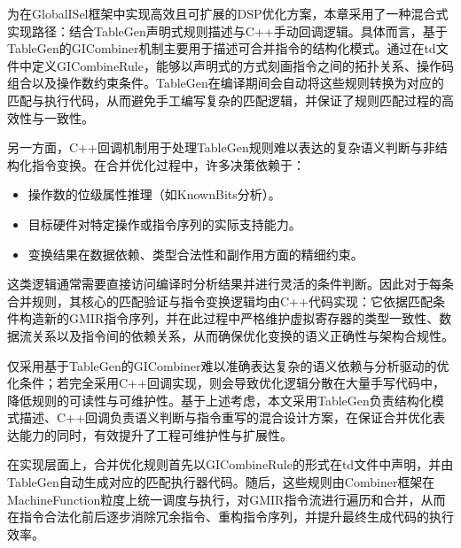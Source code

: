 \par

为在GlobalISel框架中实现高效且可扩展的DSP优化方案，本章采用了一种混合式实现路径：结合TableGen声明式规则描述与C++手动回调逻辑。具体而言，基于TableGen的GICombiner机制主要用于描述可合并指令的结构化模式。通过在td文件中定义GICombineRule，能够以声明式的方式刻画指令之间的拓扑关系、操作码组合以及操作数约束条件。TableGen在编译期间会自动将这些规则转换为对应的匹配与执行代码，从而避免手工编写复杂的匹配逻辑，并保证了规则匹配过程的高效性与一致性。

\par

另一方面，C++回调机制用于处理TableGen规则难以表达的复杂语义判断与非结构化指令变换。在合并优化过程中，许多决策依赖于：

\begin{itemize}
	\item
	操作数的位级属性推理（如KnownBits分析）。
	
	\item
	目标硬件对特定操作或指令序列的实际支持能力。
	
	\item 
	变换结果在数据依赖、类型合法性和副作用方面的精细约束。
	
\end{itemize}

这类逻辑通常需要直接访问编译时分析结果并进行灵活的条件判断。因此对于每条合并规则，其核心的匹配验证与指令变换逻辑均由C++代码实现：它依据匹配条件构造新的GMIR指令序列，并在此过程中严格维护虚拟寄存器的类型一致性、数据流关系以及指令间的依赖关系，从而确保优化变换的语义正确性与架构合规性。

\par

仅采用基于TableGen的GICombiner难以准确表达复杂的语义依赖与分析驱动的优化条件；若完全采用C++回调实现，则会导致优化逻辑分散在大量手写代码中，降低规则的可读性与可维护性。基于上述考虑，本文采用TableGen负责结构化模式描述、C++回调负责语义判断与指令重写的混合设计方案，在保证合并优化表达能力的同时，有效提升了工程可维护性与扩展性。

\par

在实现层面上，合并优化规则首先以GICombineRule的形式在td文件中声明，并由TableGen自动生成对应的匹配执行器代码。随后，这些规则由Combiner框架在MachineFunction粒度上统一调度与执行，对GMIR指令流进行遍历和合并，从而在指令合法化前后逐步消除冗余指令、重构指令序列，并提升最终生成代码的执行效率。

\par

